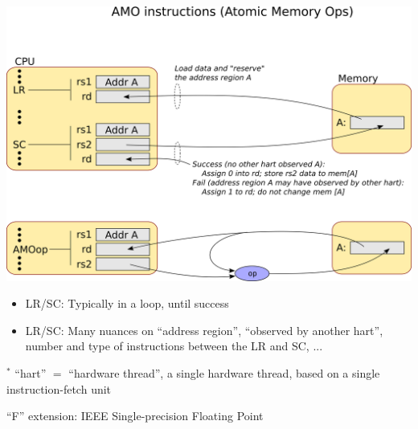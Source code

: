 \documentclass{article}
\begin{document}
\begin{center}
  \includegraphics[width=7in]{Figs/LR_SC_AMO.png}

  \vspace{1in}

  \begin{minipage}[t]{8in}
    \begin{itemize}\Large
    \item LR/SC: Typically in a loop, until success

    \item LR/SC: Many nuances on ``address region'', ``observed by
      another hart'', number and type of instructions between the LR
      and SC, ...
    \end{itemize}

    \vspace*{5ex}

    {\large $^*$ ``hart'' $=$ ``hardware thread'', a single hardware
      thread, based on a single instruction-fetch unit}
  \end{minipage}
\end{center}


\clearpage


\begin{center}
{\Huge
  ``F'' extension: IEEE Single-precision Floating Point}
\end{center}

\vspace*{0.1in}
\end{document}
